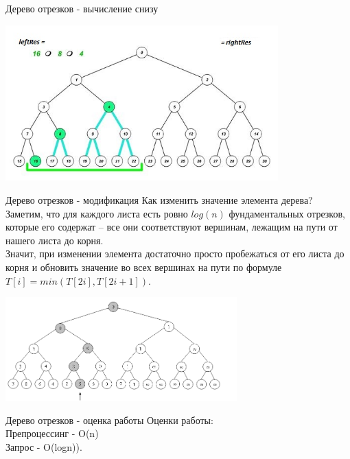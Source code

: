 \documentclass[10pt]{beamer}
\begin{document}
\begin{frame}[fragile]{Дерево отрезков - вычисление снизу}
\begin{center}
    \includegraphics[height=6cm]{Term_2/Source/images/9-up-4.jpg}
\end{center}
\end{frame}

\begin{frame}[fragile]{Дерево отрезков - модификация}
Как изменить значение элемента дерева? Заметим, что для каждого листа есть ровно $log(n)$ фундаментальных отрезков, которые его содержат – все они соответствуют вершинам, лежащим на пути от нашего листа до корня.\\
Значит, при изменении элемента достаточно просто пробежаться от его листа до корня и обновить значение во всех вершинах на пути по формуле $T[i] = min(T[2i], T[2i + 1])$. 
\begin{center}
    \includegraphics[height=4cm]{Term_2/Source/images/9-segment-tree-2-modif.png}
\end{center}
\end{frame}

\begin{frame}[fragile]{Дерево отрезков - оценка работы}
Оценки работы: \\
Препроцессинг - O(n) \\
Запрос - O(logn)).
\end{frame}
\end{document}
